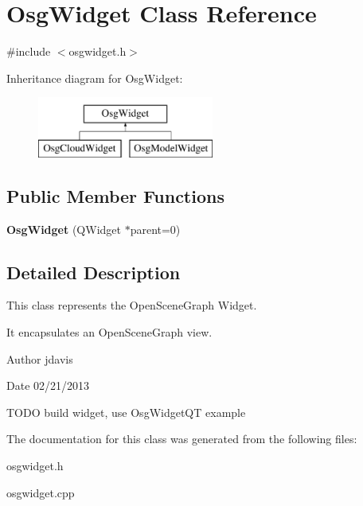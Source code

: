 \hypertarget{classOsgWidget}{\section{Osg\-Widget Class Reference}
\label{classOsgWidget}
}


{\ttfamily \#include $<$osgwidget.\-h$>$}

Inheritance diagram for Osg\-Widget\-:\begin{figure}[H]
\begin{center}
\leavevmode
\includegraphics[height=2.000000cm]{classOsgWidget}
\end{center}
\end{figure}
\subsection*{Public Member Functions}
\begin{DoxyCompactItemize}
\item 
\hypertarget{classOsgWidget_a4c0e901de6da99841750a4c6998709b1}{{\bfseries Osg\-Widget} (Q\-Widget $\ast$parent=0)}\label{classOsgWidget_a4c0e901de6da99841750a4c6998709b1}

\end{DoxyCompactItemize}


\subsection{Detailed Description}
This class represents the Open\-Scene\-Graph Widget.

It encapsulates an Open\-Scene\-Graph view.

\begin{DoxyAuthor}{Author}
jdavis 
\end{DoxyAuthor}
\begin{DoxyDate}{Date}
02/21/2013
\end{DoxyDate}
T\-O\-D\-O build widget, use Osg\-Widget\-Q\-T example 

The documentation for this class was generated from the following files\-:\begin{DoxyCompactItemize}
\item 
osgwidget.\-h\item 
osgwidget.\-cpp\end{DoxyCompactItemize}
